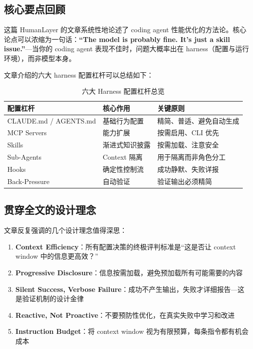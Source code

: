 \documentclass[a4paper]{article}
\begin{document}
\subsection{核心要点回顾}

这篇 HumanLayer 的文章系统性地论述了 coding agent 性能优化的方法论。核心论点可以浓缩为一句话：\textbf{``The model is probably fine. It's just a skill issue.''}---当你的 coding agent 表现不佳时，问题大概率出在 harness（配置与运行环境），而非模型本身。

文章介绍的六大 harness 配置杠杆可以总结如下：

\begin{table}[H]
\centering
\caption{六大 Harness 配置杠杆总览}
\begin{tabular}{@{}p{3.5cm}p{4cm}p{5.5cm}@{}}
\toprule
\textbf{配置杠杆} & \textbf{核心作用} & \textbf{关键原则} \\
\midrule
CLAUDE.md / AGENTS.md & 基础行为配置 & 精简、普适、避免自动生成 \\
MCP Servers & 能力扩展 & 按需启用、CLI 优先 \\
Skills & 渐进式知识披露 & 按需加载、注意安全 \\
Sub-Agents & Context 隔离 & 用于隔离而非角色分工 \\
Hooks & 确定性控制流 & 成功静默、失败详报 \\
Back-Pressure & 自动验证 & 验证输出必须精简 \\
\bottomrule
\end{tabular}
\end{table}

\subsection{贯穿全文的设计理念}

文章反复强调的几个设计理念值得深思：

\begin{enumerate}[leftmargin=1.5em]
    \item \textbf{Context Efficiency}：所有配置决策的终极评判标准是``这是否让 context window 中的信息更高效？''
    \item \textbf{Progressive Disclosure}：信息按需加载，避免预加载所有可能需要的内容
    \item \textbf{Silent Success, Verbose Failure}：成功不产生输出，失败才详细报告---这是验证机制的设计金律
    \item \textbf{Reactive, Not Proactive}：不要预防性优化，在真实失败中学习和改进
    \item \textbf{Instruction Budget}：将 context window 视为有限预算，每条指令都有机会成本
\end{enumerate}
\end{document}
